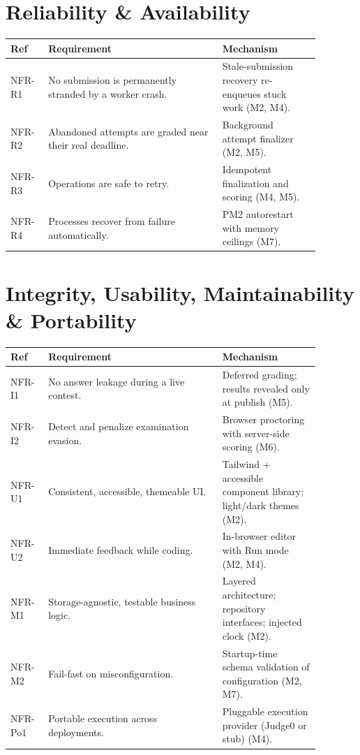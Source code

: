 \documentclass[12pt,a4paper,oneside]{report}
\begin{document}
\section{Reliability \& Availability}
\begin{longtable}{@{}p{0.10\linewidth} p{0.50\linewidth} p{0.28\linewidth}@{}}
\toprule
\textbf{Ref} & \textbf{Requirement} & \textbf{Mechanism}\\
\midrule
\endhead
NFR-R1 & No submission is permanently stranded by a worker crash. & Stale-submission recovery re-enqueues stuck work (M2, M4).\\
NFR-R2 & Abandoned attempts are graded near their real deadline. & Background attempt finalizer (M2, M5).\\
NFR-R3 & Operations are safe to retry. & Idempotent finalization and scoring (M4, M5).\\
NFR-R4 & Processes recover from failure automatically. & PM2 autorestart with memory ceilings (M7).\\
\bottomrule
\end{longtable}

\section{Integrity, Usability, Maintainability \& Portability}
\begin{longtable}{@{}p{0.10\linewidth} p{0.50\linewidth} p{0.28\linewidth}@{}}
\toprule
\textbf{Ref} & \textbf{Requirement} & \textbf{Mechanism}\\
\midrule
\endhead
NFR-I1 & No answer leakage during a live contest. & Deferred grading; results revealed only at publish (M5).\\
NFR-I2 & Detect and penalize examination evasion. & Browser proctoring with server-side scoring (M6).\\
NFR-U1 & Consistent, accessible, themeable UI. & Tailwind + accessible component library; light/dark themes (M2).\\
NFR-U2 & Immediate feedback while coding. & In-browser editor with Run mode (M2, M4).\\
NFR-M1 & Storage-agnostic, testable business logic. & Layered architecture; repository interfaces; injected clock (M2).\\
NFR-M2 & Fail-fast on misconfiguration. & Startup-time schema validation of configuration (M2, M7).\\
NFR-Po1 & Portable execution across deployments. & Pluggable execution provider (Judge0 or stub) (M4).\\
\bottomrule
\end{longtable}
\end{document}
